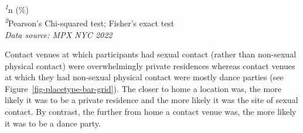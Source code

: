 \documentclass[
  letterpaper,
  DIV=11,
  numbers=noendperiod,
  oneside]{scrreprt}
\begin{document}
\begin{minipage}{\linewidth}
\textsuperscript{\textit{1}}n (\%)\\
\textsuperscript{\textit{2}}Pearson's Chi-squared test; Fisher's exact test\\
\emph{Data source: MPX NYC 2022}\\
\end{minipage}

Contact venues at which participants had sexual contact (rather than
non-sexual physical contact) were overwhelmingly private residences
whereas contact venues at which they had non-sexual physical contact
were mostly dance parties (see Figure~\ref{fig-placetype-bar-grid}). The
closer to home a location was, the more likely it was to be a private
residence and the more likely it was the site of sexual contact. By
contrast, the further from home a contact venue was, the more likely it
was to be a dance party.
\end{document}
